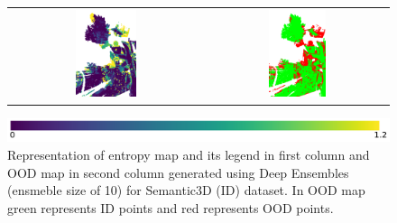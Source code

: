 \begin{figure}[h!]
\begin{tabular}{cc}
            \includegraphics[width=0.33\textwidth, height=0.18\textheight]{images/ood_imgs/de_sem3d/de_ent_10_3.pdf}& 
            \includegraphics[width=0.33\textwidth, height=0.18\textheight]{images/ood_imgs/de_sem3d/de_ent_ood_auroc_3.pdf}\\
        \end{tabular}
        \includegraphics[scale=0.45]{images/ent_legend.pdf}
        \caption{Representation of entropy map and its legend in first column and OOD map in second column generated using Deep Ensembles (ensmeble size of 10) for Semantic3D (ID) dataset. In OOD map green represents ID points and red represents OOD points.}
        \label{fig:de_ood_auroc_sem3d_ent}
    \end{figure}
